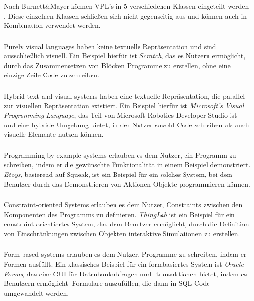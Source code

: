 \documentclass[ngerman]{article}
\begin{document}
Nach Burnett\&Mayer können VPL's in 5 verschiedenen Klassen eingeteilt werden \cite{BURNETT1994287}. Diese einzelnen Klassen schließen sich nicht gegenseitig aus und können auch in Kombination verwendet werden.

\subsubsection{}
Purely visual languages haben keine textuelle Repräsentation und sind ausschließlich visuell. Ein Beispiel hierfür ist \textit{Scratch}, das es Nutzern ermöglicht, durch das Zusammensetzen von Blöcken Programme zu erstellen, ohne eine einzige Zeile Code zu schreiben.


\subsubsection{}
Hybrid text and visual systems haben eine textuelle Repräsentation, die parallel zur visuellen Repräsentation existiert. Ein Beispiel hierfür ist \textit{Microsoft's Visual Programming Language}, das Teil von Microsoft Robotics Developer Studio ist und eine hybride Umgebung bietet, in der Nutzer sowohl Code schreiben als auch visuelle Elemente nutzen können.

\subsubsection{}
Programming-by-example systems erlauben es dem Nutzer, ein Programm zu schreiben, indem er die gewünschte Funktionalität in einem Beispiel demonstriert. \textit{Etoys}, basierend auf Squeak, ist ein Beispiel für ein solches System, bei dem Benutzer durch das Demonstrieren von Aktionen Objekte programmieren können.

\subsubsection{}
Constraint-oriented Systems erlauben es dem Nutzer, Constraints zwischen den Komponenten des Programms zu definieren. \textit{ThingLab} ist ein Beispiel für ein constraint-orientiertes System, das dem Benutzer ermöglicht, durch die Definition von Einschränkungen zwischen Objekten interaktive Simulationen zu erstellen.

\subsubsection{}
Form-based systems erlauben es dem Nutzer, Programme zu schreiben, indem er Formen ausfüllt. Ein klassisches Beispiel für ein formbasiertes System ist \textit{Oracle Forms}, das eine GUI für Datenbankabfragen und -transaktionen bietet, indem es Benutzern ermöglicht, Formulare auszufüllen, die dann in SQL-Code umgewandelt werden.
\end{document}
